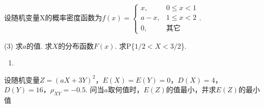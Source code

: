 \begin{problem}
    设随机变量X的概率密度函数为$f(x)=
    \begin{cases}
        x,   & 0\leq x<1\\
        a-x, & 1\leq x<2\\
        0,   & \text{其它}
    \end{cases}$.
    \begin{tasks}[label=\arabic*.](3)
        \task 求$a$的值.
        \task 求$X$的分布函数$F(x)$.
        \task 求P\{$1/2<X<3/2$\}.
    \end{tasks}
\end{problem}
\begin{solution}\leavevmode
    \begin{enumerate}
        \item 
    \end{enumerate}
\end{solution}

\begin{problem}[本题7分]
    设随机变量$Z=(aX+3Y)^2$，$E(X)=E(Y)=0$，$D(X)=4$，$D(Y)=16$，$\rho_{XY}=-0.5$. 问当$a$取何值时，$E(Z)$的值最小，并求$E(Z)$的最小值
\end{problem}
\begin{solution}

\end{solution}